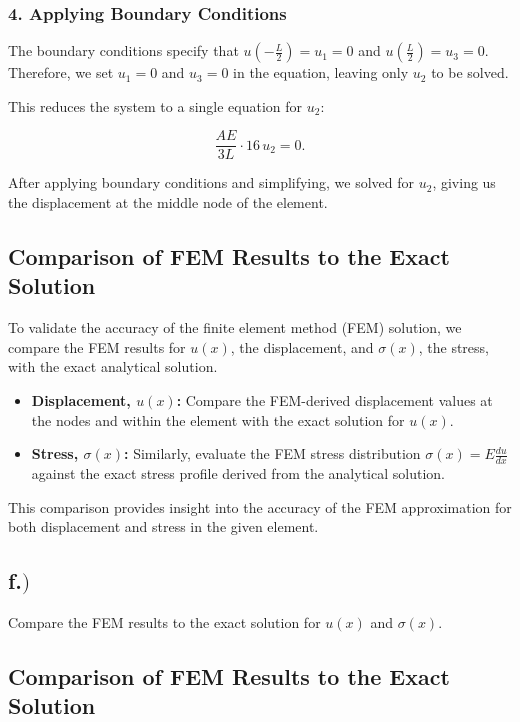 \documentclass{article}
\begin{document}
\subsubsection*{4. Applying Boundary Conditions}

The boundary conditions specify that \( u\left(-\frac{L}{2}\right) = u_1 = 0 \) and \( u\left(\frac{L}{2}\right) = u_3 = 0 \). Therefore, we set \( u_1 = 0 \) and \( u_3 = 0 \) in the equation, leaving only \( u_2 \) to be solved.

This reduces the system to a single equation for \( u_2 \):

\[
\frac{AE}{3L} \cdot 16 \, u_2 = 0.
\]

After applying boundary conditions and simplifying, we solved for \( u_2 \), giving us the displacement at the middle node of the element.

\subsection*{Comparison of FEM Results to the Exact Solution}

To validate the accuracy of the finite element method (FEM) solution, we compare the FEM results for \( u(x) \), the displacement, and \( \sigma(x) \), the stress, with the exact analytical solution.

\begin{itemize}
    \item \textbf{Displacement, \( u(x) \):} Compare the FEM-derived displacement values at the nodes and within the element with the exact solution for \( u(x) \).
    \item \textbf{Stress, \( \sigma(x) \):} Similarly, evaluate the FEM stress distribution \( \sigma(x) = E \frac{du}{dx} \) against the exact stress profile derived from the analytical solution.
\end{itemize}

This comparison provides insight into the accuracy of the FEM approximation for both displacement and stress in the given element.

\newpage
\subsection*{f.$)$}

Compare the FEM results to the exact solution for $u(x)$ and $\sigma(x)$.

\subsection*{Comparison of FEM Results to the Exact Solution}
\end{document}

